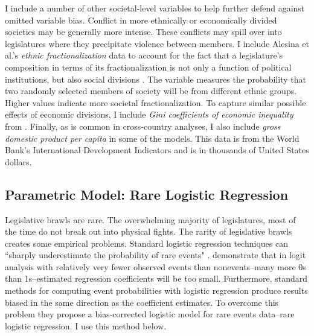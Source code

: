 \documentclass[a4paper]{article}\usepackage{graphicx, color}
\begin{document}
I include a number of other societal-level variables to help further defend against omitted variable bias. Conflict in more ethnically or economically divided societies may be generally more intense. These conflicts may spill over into legislatures where they precipitate violence between members. I include Alesina et al.'s \citeyearpar{Alesina2003} {\emph{ethnic fractionalization}} data to account for the fact that a legislature's composition in terms of its fractionalization is not only a function of political institutions, but also social divisions \citep{Neto1997, Mozaffar2003}. The variable measures the probability that two randomly selected members of society will be from different ethnic groups. Higher values indicate more societal fractionalization. To capture similar possible effects of economic divisions, I include {\emph{Gini coefficients of economic inequality}} from \cite{UNU2008}. Finally, as is common in cross-country analyses, I also include {\emph{gross domestic product per capita}} in some of the models. This data is from the World Bank's International Development Indicators \citeyearpar{WorldBank2011} and is in thousands of United States dollars.

\subsection{Parametric Model: Rare Logistic Regression}

Legislative brawls are rare. The overwhelming majority of legislatures, most of the time do not break out into physical fights. The rarity of legislative brawls creates some empirical problems. Standard logistic regression techniques can ``sharply underestimate the probability of rare events" \cite[137]{KingRareEventsPA2001}. \cite{KingRareEventsPA2001} demonstrate that in logit analysis with relatively very fewer observed events than nonevents--many more 0s than 1s--estimated regression coefficients will be too small. Furthermore, standard methods for computing event probabilities with logistic regression produce results biased in the same direction as the coefficient estimates. To overcome this problem they propose a bias-corrected logistic model for rare events data--rare logistic regression. I use this method below.
\end{document}
